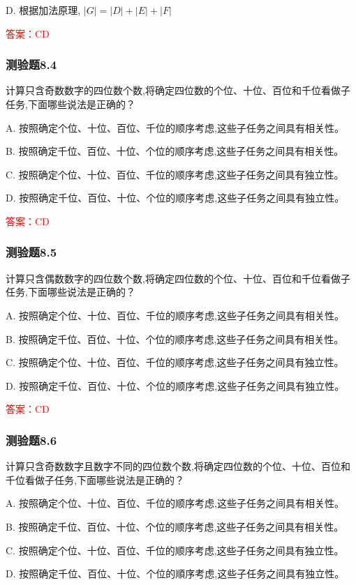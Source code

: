 \documentclass[UTF8, heading=true]{ctexart}
\begin{document}
D. 根据加法原理, $|G|=|D|+|E|+|F|$

\textcolor{red}{答案：CD}
\subsubsection{测验题8.4}
计算只含奇数数字的四位数个数,将确定四位数的个位、十位、百位和千位看做子任务,下面哪些说法是正确的？

A. 按照确定个位、十位、百位、千位的顺序考虑,这些子任务之间具有相关性。

B. 按照确定千位、百位、十位、个位的顺序考虑,这些子任务之间具有相关性。

C. 按照确定个位、十位、百位、千位的顺序考虑,这些子任务之间具有独立性。

D. 按照确定千位、百位、十位、个位的顺序考虑,这些子任务之间具有独立性。

\textcolor{red}{答案：CD}

\subsubsection{测验题8.5}

计算只含偶数数字的四位数个数,将确定四位数的个位、十位、百位和千位看做子任务,下面哪些说法是正确的？

A. 按照确定个位、十位、百位、千位的顺序考虑,这些子任务之间具有相关性。

B. 按照确定千位、百位、十位、个位的顺序考虑,这些子任务之间具有相关性。

C. 按照确定个位、十位、百位、千位的顺序考虑,这些子任务之间具有独立性。

D. 按照确定千位、百位、十位、个位的顺序考虑,这些子任务之间具有独立性。

\textcolor{red}{答案：CD}

\subsubsection{测验题8.6}

计算只含奇数数字且数字不同的四位数个数,将确定四位数的个位、十位、百位和千位看做子任务,下面哪些说法是正确的？

A. 按照确定个位、十位、百位、千位的顺序考虑,这些子任务之间具有相关性。

B. 按照确定千位、百位、十位、个位的顺序考虑,这些子任务之间具有相关性。

C. 按照确定个位、十位、百位、千位的顺序考虑,这些子任务之间具有独立性。

D. 按照确定千位、百位、十位、个位的順序考虑,这些子任务之间具有独立性。
\end{document}
